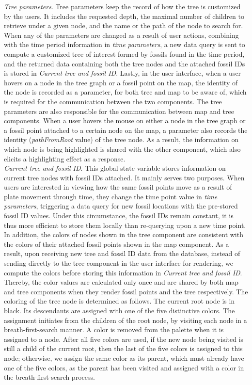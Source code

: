 \documentclass[11pt, a4paper,oneside,chapterprefix=false]{scrbook}
\begin{document}
\emph{Tree parameters}. Tree parameters keep the record of how the tree is customized by the users. It includes the requested depth, the maximal number of children to retrieve under a given node, and the name or the path of the node to search for. When any of the parameters are changed as a result of user actions, combining with the time period information in \emph{time parameters}, a new data query is sent to compute a customized tree of interest formed by fossils found in the time period, and the returned data containing both the tree nodes and the attached fossil IDs is stored in \emph{Current tree and fossil ID}. Lastly, in the user interface, when a user hovers on a node in the tree graph or a fossil point on the map, the identity of the node is recorded as a parameter, for both tree and map to be aware of, which is required for the communication between the two components. The tree parameters are also responsible for the communication between map and tree components. When a user hovers the mouse on either a node in the tree graph or a fossil point attached to a certain node on the map, a parameter also records the identity (\emph{pathFromRoot} value) of the tree node. As a result, the information on which node is being highlighted is shared with the other component, which also elicits a highlighting effect as a response. \\

\emph{Current tree and fossil ID}. This global state variable stores information on current tree nodes with fossil IDs attached. It mainly serves two purposes. When users are interested in viewing how the same fossil points move as a result of plate movement through time, they change the time point value in \emph{time parameters}, triggering a data query for new fossil locations with the pre-stored fossil ID values. Under this circumstance, the fossil IDs remain constant, it is thus more efficient to store them locally than re-querying upon a new time point. In addition, the colors of nodes shown in the tree component are consistent with the colors of their attached fossil points shown in the map component. As a result, upon receiving new tree and fossil ID data from the database, instead of sending directly to the tree component in the user interface for rendering, we compute the colors before storing this information in \emph{Current tree and fossil ID}. Thereby, the color values are calculated only once and are shared by both map and tree components when they render fossil points and the tree respectively. The coloring of the tree node is determined as follows. The current root node is in black. Its descendants are assigned with one of the five distinctive colors. The assignment initiates from the children of the root node, by visiting each node in a breath-first-search manner. A color is removed from the palette when it is assigned to a node. After all five colors are used, if the new node being visited is still a child of the current root, then the last of the five colors is assigned to this node; otherwise, we assign the same color as its parent, which must already have one of the five colors, as the parent has been visited and assigned with a color in the breath-first-search process. 
\end{document}

